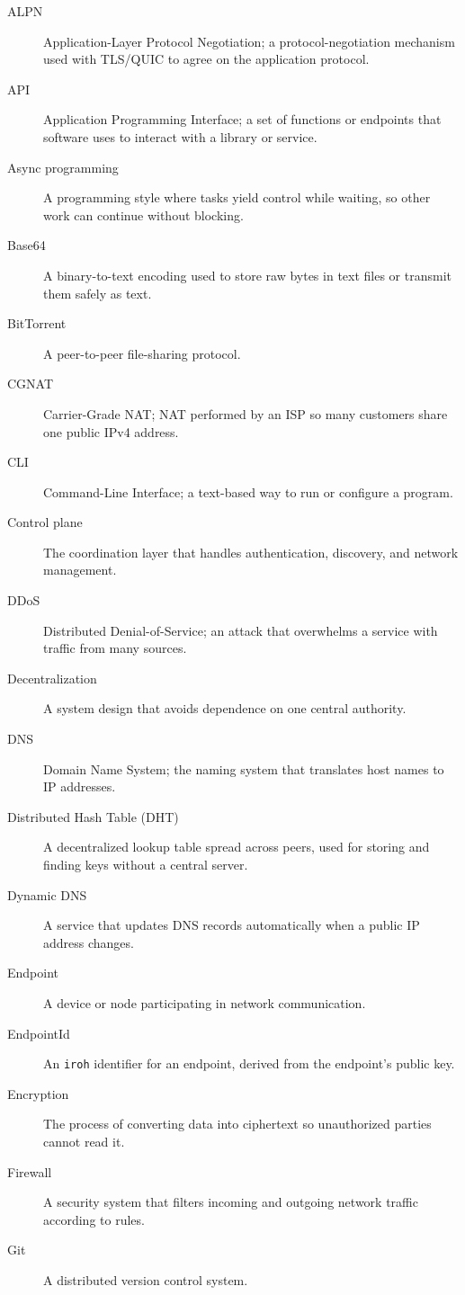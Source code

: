 \documentclass[a4paper, 10pt]{article}
\begin{document}
\begin{description}
  \item[ALPN] Application-Layer Protocol Negotiation; a protocol-negotiation mechanism used with TLS/QUIC to agree on the application protocol.
  \item[API] Application Programming Interface; a set of functions or endpoints that software uses to interact with a library or service.
  \item[Async programming] A programming style where tasks yield control while waiting, so other work can continue without blocking.
  \item[Base64] A binary-to-text encoding used to store raw bytes in text files or transmit them safely as text.
  \item[BitTorrent] A peer-to-peer file-sharing protocol.
  \item[CGNAT] Carrier-Grade NAT; NAT performed by an ISP so many customers share one public IPv4 address.
  \item[CLI] Command-Line Interface; a text-based way to run or configure a program.
  \item[Control plane] The coordination layer that handles authentication, discovery, and network management.
  \item[DDoS] Distributed Denial-of-Service; an attack that overwhelms a service with traffic from many sources.
  \item[Decentralization] A system design that avoids dependence on one central authority.
  \item[DNS] Domain Name System; the naming system that translates host names to IP addresses.
  \item[Distributed Hash Table (DHT)] A decentralized lookup table spread across peers, used for storing and finding keys without a central server.
  \item[Dynamic DNS] A service that updates DNS records automatically when a public IP address changes.
  \item[Endpoint] A device or node participating in network communication.
  \item[EndpointId] An \texttt{iroh} identifier for an endpoint, derived from the endpoint's public key.
  \item[Encryption] The process of converting data into ciphertext so unauthorized parties cannot read it.
  \item[Firewall] A security system that filters incoming and outgoing network traffic according to rules.
  \item[Git] A distributed version control system.

\end{description}
\end{document}

